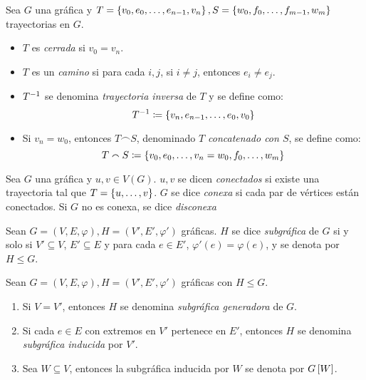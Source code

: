 \begin{definition}
	Sea $G$ una gráfica y $T =\left\{ v_{0}, e_{0},\dotsc, e_{n - 1}, v_{n} \right\}, S =\left\{ w_{0}, f_{0},\dotsc, f_{m - 1}, w_{m} \right\}$ trayectorias en $G$.
	\begin{itemize}
		\item $T$ es \emph{cerrada} si $v_{0} = v_{n}$.
		\item $T$ es un \emph{camino} si para cada $i, j$, si $i\neq j$, entonces $e_{i}\neq e_{j}$.
		\item $\minv{T}$ se denomina \emph{trayectoria inversa} de $T$ y se define como:
		\[ \minv{T}\coloneqq\set{v_{n}, e_{n - 1},\dotsc, e_{0}, v_{0}} \]
		\item Si $v_{n} = w_{0}$, entonces $T\smallfrown S$, denominado \emph{$T$ concatenado con $S$}, se define como:
		\[ T\smallfrown S\coloneqq\left\{ v_{0}, e_{0},\dotsc, v_{n} = w_{0}, f_{0},\dotsc, w_{m} \right\} \]
	\end{itemize}
\end{definition}
\begin{definition}[Conexidad]
	Sea $G$ una gráfica y $u, v\in V(G)$. $u, v$ se dicen \emph{conectados} si existe una trayectoria tal que $T =\left\{ u,\dotsc, v \right\}$. $G$ se dice \emph{conexa} si cada par de vértices están conectados. Si $G$ no es conexa, se dice \emph{disconexa}
\end{definition}
\begin{definition}[Subgráfica]
	Sean $G = (V, E,\varphi), H = (V', E',\varphi')$ gráficas. $H$ se dice \emph{subgráfica} de $G$ si y solo si $V'\subseteq V$, $E'\subseteq E$ y para cada $e\in E'$, $\varphi'(e) =\varphi(e)$, y se denota por $H\leq G$.
\end{definition}
\begin{figure}[H]
	\centering
\end{figure}
\begin{definition}
	Sean $G = (V, E,\varphi), H = (V', E',\varphi')$ gráficas con $H\leq G$.
	\begin{enumerate}
		\item Si $V = V'$, entonces $H$ se denomina \emph{subgráfica generadora} de $G$.
		\item Si cada $e\in E$ con extremos en $V'$ pertenece en $E'$, entonces $H$ se denomina \emph{subgráfica inducida} por $V'$.
		\item Sea $W\subseteq V$, entonces la subgráfica inducida por $W$ se denota por $G\left[ W \right]$.
	\end{enumerate}
\end{definition}
